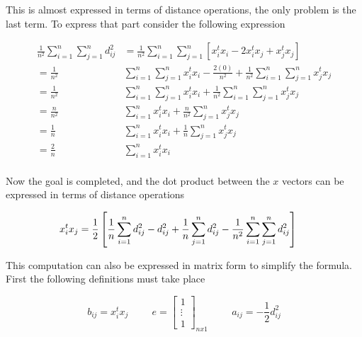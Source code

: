 \documentclass[12pt,journal]{IEEEtran}
\begin{document}
    This is almost expressed in terms of distance operations, the only problem
    is the last term. To express that part consider the following expression

    \begin{equation*}
        \begin{aligned}
            \frac{1}{n^2}\sum_{i=1}^n \sum_{j=1}^n d_{ij}^2
            &=
            \frac{1}{n^2}\sum_{i=1}^n \sum_{j=1}^n [x_i^t x_i - 2 x_i^t x_j + x_j^t x_j]\\
            =
            \frac{1}{n^2}&\sum_{i=1}^n \sum_{j=1}^n x_i^t x_i - \frac{2(0)}{n^2} +  \frac{1}{n^2}\sum_{i=1}^n \sum_{j=1}^nx_j^t x_j\\
            =
            \frac{1}{n^2}&\sum_{i=1}^n \sum_{j=1}^n x_i^t x_i +  \frac{1}{n^2}\sum_{i=1}^n \sum_{j=1}^nx_j^t x_j\\
            =
            \frac{n}{n^2}&\sum_{i=1}^n x_i^t x_i +  \frac{n}{n^2}\sum_{j=1}^n x_j^t x_j\\
            =
            \frac{1}{n}&\sum_{i=1}^n x_i^t x_i +  \frac{1}{n}\sum_{j=1}^n x_j^t x_j\\
            =
            \frac{2}{n}&\sum_{i=1}^n x_i^t x_i\\
        \end{aligned}
    \end{equation*}

    Now the goal is completed, and the dot product between the $x$ vectors
    can be expressed in terms of distance operations

    \begin{equation*}
        \hspace{-0.5cm}
        \begin{aligned}
            x_i^t x_j
            &=
            \frac{1}{2} \left[ \frac{1}{n} \sum_{i=1}^n d_{ij}^2 - d_{ij}^2 + \frac{1}{n} \sum_{j=1}^n d_{ij}^2 - \frac{1}{n^2}\sum_{i=1}^n \sum_{j=1}^n d_{ij}^2 \right]\\
        \end{aligned}
    \end{equation*}

    This computation can also be expressed in matrix form to simplify the formula.
    First the following definitions must take place

    \[
        b_{ij} = x_i^t x_j
        \hspace{1cm}
        e =
        \begin{bmatrix}
            1\\
            \vdots\\
            1
        \end{bmatrix}_{nx1}
        \hspace{1cm}
        a_{ij} = -\frac{1}{2} d_{ij}^2
    \]
\end{document}
